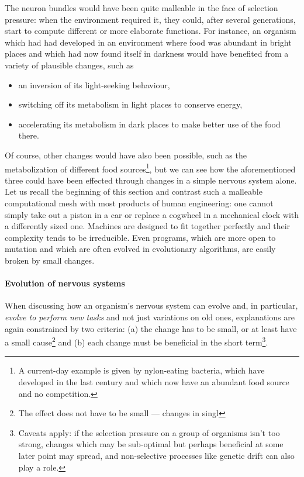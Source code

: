 \documentclass[]{scrartcl}
\begin{document}
The neuron bundles would have been quite malleable in the face of selection pressure: when the environment required it, they could, after several generations, start to compute different or more elaborate functions. For instance, an organism which had had developed in an environment where food was abundant in bright places and which had now found itself in darkness would have benefited from a variety of plausible changes, such as
\begin{itemize}
	\item an inversion of its light-seeking behaviour,
	\item switching off its metabolism in light places to conserve energy,
	\item accelerating its metabolism in dark places to make better use of the food there.
\end{itemize}

Of course, other changes would have also been possible, such as the metabolization of different food sources\footnote{A current-day example is given by nylon-eating bacteria, which have developed in the last century and which now have an abundant food source and no competition.}, but we can see how the aforementioned three could have been effected through changes in a simple nervous system alone. Let us recall the beginning of this section and contrast such a malleable computational mesh with most products of human engineering: one cannot simply take out a piston in a car or replace a cogwheel in a mechanical clock with a differently sized one. Machines are designed to fit together perfectly and their complexity tends to be irreducible. Even programs, which are more open to mutation and which are often evolved in evolutionary algorithms, are easily broken by small changes.

\paragraph{Evolution of nervous systems} When discussing how an organism's nervous system can evolve and, in particular, {\em evolve to perform new tasks} and not just variations on old ones, explanations are again constrained by two criteria: (a) the change has to be small, or at least have a small cause\footnote{The effect does not have to be small --- changes in singl} and (b) each change must be beneficial in the short term\footnote{Caveats apply: if the selection pressure on a group of organisms isn't too strong, changes which may be sub-optimal but perhaps beneficial at some later point may spread, and non-selective processes like genetic drift can also play a role.}.
\end{document}

